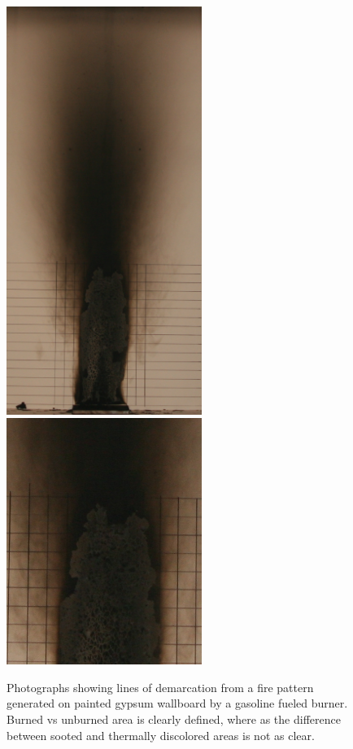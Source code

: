 \documentclass[twoside]{uocthesis}
\begin{document}
{\begin{figure}[p]
	\centering
	\includegraphics[width=2.5in]{../Figures/Soot_pattern}
	\includegraphics[width=2.5in]{../Figures/Soot_close}	\\
	\caption[Photographs showing lines of demarcation with gasoline]{Photographs showing lines of demarcation from a fire pattern generated on painted gypsum wallboard by a gasoline fueled burner.  Burned vs unburned area is clearly defined, where as the difference between sooted and thermally discolored areas is not as clear.}
	\label{Soot_pattern}
\end{figure}


}
\end{document}
